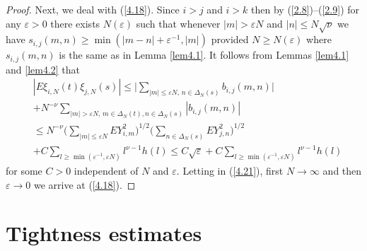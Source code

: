 \begin{proof}
Next, we deal with (\ref{4.18}). Since $i>j$ and $i>k$ then by 
(\ref{2.8})--(\ref{2.9}) for any ${{\varepsilon}}>0$ there exists $N({{\varepsilon}})$ such that
 whenever $|m|>{{\varepsilon}} N$ and $|n|\leq N\sqrt\nu$ we have $s_{i,j}(m,n)
 \geq\min(|m-n|+{{\varepsilon}}^{-1},|m|)$ provided $N\geq N({{\varepsilon}})$ where $s_{i,j}(m,n)$ is the same
 as in Lemma \ref{lem4.1}. It follows from Lemmas \ref{lem4.1} and 
 \ref{lem4.2} that
 \begin{eqnarray}\label{4.21}
 &|E\xi_{i,N}(t)\xi_{j,N}(s)|\leq \big\vert\sum_{|m|\leq{{\varepsilon}} N,\, n\in{{\Delta}}_N(s)}
 b_{i,j}(m,n)\big\vert\\
 & +N^{-\nu}\sum_{|m|>{{\varepsilon}} N,\, m\in{{\Delta}}_N(t),n\in{{\Delta}}_N(s)}
 |b_{i,j}(m,n)|\nonumber\\
 &\leq N^{-\nu}\big(\sum_{|m|\leq{{\varepsilon}} N}EY_{i,m}^2\big)^{1/2}
 \big(\sum_{n\in{{\Delta}}_N(s)}EY^2_{j,n}\big)^{1/2}\nonumber\\
 &+C\sum_{l\geq\min({{\varepsilon}}^{-1},{{\varepsilon}} N)}l^{\nu-1} h(l)
 \leq C\sqrt{{\varepsilon}}+C\sum_{l\geq\min({{\varepsilon}}^{-1},{{\varepsilon}} N)}l^{\nu-1} h(l)\nonumber
 \end{eqnarray}
 for some $C>0$ independent of $N$ and ${{\varepsilon}}$. Letting in (\ref{4.21}), 
 first $N\to\infty$ and then ${{\varepsilon}}\to 0$ we arrive at (\ref{4.18}).
\end{proof}

\section{Tightness estimates}\label{sec5}\setcounter{equation}{0}

